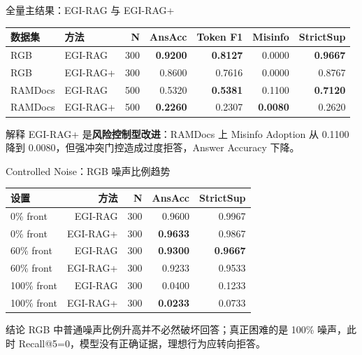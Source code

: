 \documentclass[aspectratio=169,10pt]{beamer}
\newcommand{\risk}[1]{\textcolor{MainRed}{\textbf{#1}}}
\newcommand{\gain}[1]{\textcolor{MainGreen}{\textbf{#1}}}
\begin{document}
\begin{frame}{全量主结果：EGI-RAG 与 EGI-RAG+}
  \centering
  \small
  \begin{tabular}{llrrrrr}
    \toprule
    数据集 & 方法 & N & AnsAcc & Token F1 & Misinfo & StrictSup \\
    \midrule
    RGB & EGI-RAG & 300 & \gain{0.9200} & \gain{0.8127} & 0.0000 & \gain{0.9667} \\
    RGB & EGI-RAG+ & 300 & 0.8600 & 0.7616 & 0.0000 & 0.8767 \\
    RAMDocs & EGI-RAG & 500 & 0.5320 & \gain{0.5381} & 0.1100 & \gain{0.7120} \\
    RAMDocs & EGI-RAG+ & 500 & \risk{0.2260} & 0.2307 & \gain{0.0080} & 0.2620 \\
    \bottomrule
  \end{tabular}
  \vspace{0.4cm}
  \begin{block}{解释}
    EGI-RAG+ 是\textbf{风险控制型改进}：RAMDocs 上 Misinfo Adoption 从 0.1100 降到 0.0080，但强冲突门控造成过度拒答，Answer Accuracy 下降。
  \end{block}
\end{frame}

\begin{frame}{Controlled Noise：RGB 噪声比例趋势}
  \centering
  \small
  \begin{tabular}{lrrrr}
    \toprule
    设置 & 方法 & N & AnsAcc & StrictSup \\
    \midrule
    0\% front & EGI-RAG & 300 & 0.9600 & 0.9967 \\
    0\% front & EGI-RAG+ & 300 & \gain{0.9633} & 0.9867 \\
    60\% front & EGI-RAG & 300 & \gain{0.9300} & \gain{0.9667} \\
    60\% front & EGI-RAG+ & 300 & 0.9233 & 0.9533 \\
    100\% front & EGI-RAG & 300 & 0.0400 & 0.1233 \\
    100\% front & EGI-RAG+ & 300 & \risk{0.0233} & 0.0733 \\
    \bottomrule
  \end{tabular}
  \vspace{0.35cm}
  \begin{block}{结论}
    RGB 中普通噪声比例升高并不必然破坏回答；真正困难的是 100\% 噪声，此时 Recall@5=0，模型没有正确证据，理想行为应转向拒答。
  \end{block}
\end{frame}
\end{document}

